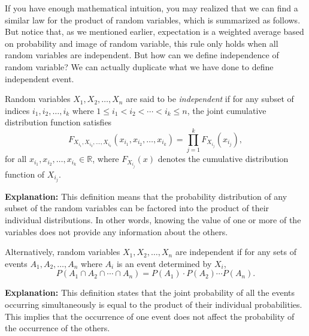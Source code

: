 If you have enough mathematical intuition, you may realized that we can find a similar law for the product of random variables, which is summarized as follows.
But notice that, as we mentioned earlier, expectation is a weighted average based on probability and image of random variable, this rule only holds when all random variables are independent. But how can we define independence of random variable? We can actually duplicate what we have done to define independent event.

\begin{definition}[Independence]
    Random variables \( X_1, X_2, \ldots, X_n \) are said to be \textit{independent} if for any subset of indices \( i_1, i_2, \ldots, i_k \) where \( 1 \leq i_1 < i_2 < \cdots < i_k \leq n \), the joint cumulative distribution function satisfies
    \[
    F_{X_{i_1}, X_{i_2}, \ldots, X_{i_k}}(x_{i_1}, x_{i_2}, \ldots, x_{i_k}) = \prod_{j=1}^k F_{X_{i_j}}(x_{i_j}),
    \]
    for all \( x_{i_1}, x_{i_2}, \ldots, x_{i_k} \in \mathbb{R} \), where \( F_{X_{i_j}}(x) \) denotes the cumulative distribution function of \( X_{i_j} \).

    \textbf{Explanation:} This definition means that the probability distribution of any subset of the random variables can be factored into the product of their individual distributions. In other words, knowing the value of one or more of the variables does not provide any information about the others.
\end{definition}

\begin{definition}
    Alternatively, random variables \( X_1, X_2, \ldots, X_n \) are independent if for any sets of events \( A_1, A_2, \ldots, A_n \) where \( A_i \) is an event determined by \( X_i \),
    \[
    P(A_1 \cap A_2 \cap \cdots \cap A_n) = P(A_1) \cdot P(A_2) \cdots P(A_n).
    \]

    \textbf{Explanation:} This definition states that the joint probability of all the events occurring simultaneously is equal to the product of their individual probabilities. This implies that the occurrence of one event does not affect the probability of the occurrence of the others.
\end{definition}


